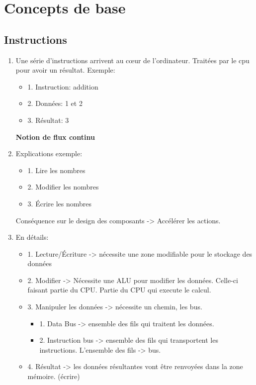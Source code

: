 \chapter{Concepts de base}
\section{Instructions}
\begin{enumerate}
\item Une série d'instructions arrivent au cœur de l'ordinateur.
Traitées par le cpu pour avoir un résultat.
Exemple:
\begin{itemize}
  \item 1. Instruction: addition
  \item 2. Données: 1 et 2 
  \item 3. Résultat: 3
\end{itemize}
\textbf{Notion de flux continu}

\item Explications exemple: 
\begin{itemize}
  \item 1. Lire les nombres
  \item 2. Modifier les nombres
  \item 3. Écrire les nombres
\end{itemize}
Conséquence sur le design des composants -> Accélérer les actions.\bigskip

\item En détails:
\begin{itemize}
  \item1. Lecture/Écriture -> nécessite une zone modifiable pour le stockage des données

  \item2. Modifier -> Nécessite une ALU pour modifier les données. Celle-ci faisant partie du CPU.
Partie du CPU qui execute le calcul.

 \item 3. Manipuler les données -> nécessite un chemin, les bus.
 \begin{itemize}
    \item 1. Data Bus -> ensemble des fils qui traitent les données.
    \item 2. Instruction bus -> ensemble des fils qui transportent les instructions.
  L'ensemble des fils -> bus.
  \end{itemize}
  \item 4. Résultat -> les données résultantes vont être renvoyées dans la zone mémoire. (écrire)
\end{itemize}
\end{enumerate}
